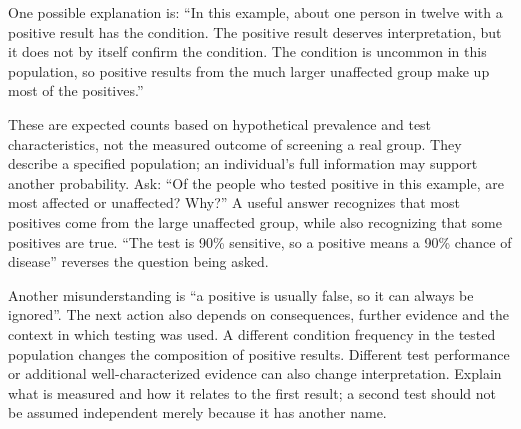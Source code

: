 One possible explanation is: ``In this example, about one person in twelve with a positive result has the condition. The positive result deserves interpretation, but it does not by itself confirm the condition. The condition is uncommon in this population, so positive results from the much larger unaffected group make up most of the positives.''

These are expected counts based on hypothetical prevalence and test characteristics, not the measured outcome of screening a real group. They describe a specified population; an individual's full information may support another probability.
Ask: ``Of the people who tested positive in this example, are most affected or unaffected? Why?'' A useful answer recognizes that most positives come from the large unaffected group, while also recognizing that some positives are true. ``The test is 90\% sensitive, so a positive means a 90\% chance of disease'' reverses the question being asked.

Another misunderstanding is ``a positive is usually false, so it can always be ignored''. The next action also depends on consequences, further evidence and the context in which testing was used.
A different condition frequency in the tested population changes the composition of positive results. Different test performance or additional well-characterized evidence can also change interpretation. Explain what is measured and how it relates to the first result; a second test should not be assumed independent merely because it has another name.

